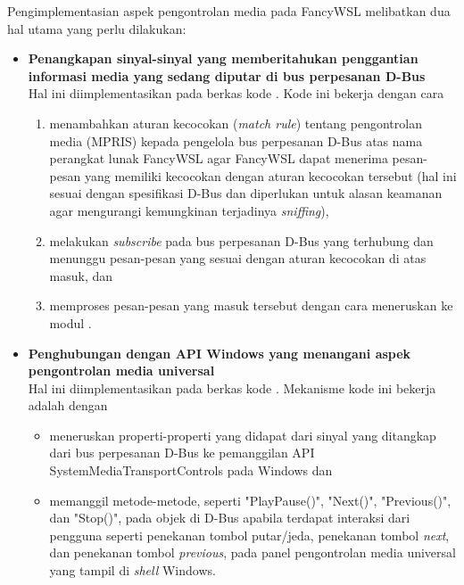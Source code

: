 Pengimplementasian aspek pengontrolan media pada FancyWSL melibatkan dua hal utama yang perlu dilakukan:
\begin{itemize}
    \item \textbf{Penangkapan sinyal-sinyal yang memberitahukan penggantian informasi media yang sedang diputar di bus perpesanan D-Bus}\\
    Hal ini diimplementasikan pada berkas kode . Kode ini bekerja dengan cara
    \begin{enumerate}
        \item menambahkan aturan kecocokan (\textit{match rule}) tentang pengontrolan media (MPRIS) kepada pengelola bus perpesanan D-Bus atas nama perangkat lunak FancyWSL agar FancyWSL dapat menerima pesan-pesan yang memiliki kecocokan dengan aturan kecocokan tersebut (hal ini sesuai dengan spesifikasi D-Bus \cite{dbus-specification} dan diperlukan untuk alasan keamanan agar mengurangi kemungkinan terjadinya \textit{sniffing}),
        
        \item melakukan \textit{subscribe} pada bus perpesanan D-Bus yang terhubung dan menunggu pesan-pesan yang sesuai dengan aturan kecocokan di atas masuk, dan
        
        \item memproses pesan-pesan yang masuk tersebut dengan cara meneruskan ke modul .
    \end{enumerate}

    \item \textbf{Penghubungan dengan API Windows yang menangani aspek pengontrolan media universal}\\
    Hal ini diimplementasikan pada berkas kode . Mekanisme kode ini bekerja adalah dengan
    \begin{itemize}
        \item meneruskan properti-properti yang didapat dari sinyal yang ditangkap dari bus perpesanan D-Bus ke pemanggilan API SystemMediaTransportControls pada Windows dan
        
        \item memanggil metode-metode, seperti "PlayPause()", "Next()", "Previous()", dan "Stop()", pada objek  di D-Bus apabila terdapat interaksi dari pengguna seperti penekanan tombol putar/jeda, penekanan tombol \textit{next}, dan penekanan tombol \textit{previous}, pada panel pengontrolan media universal yang tampil di \textit{shell} Windows.
    \end{itemize}
\end{itemize}

